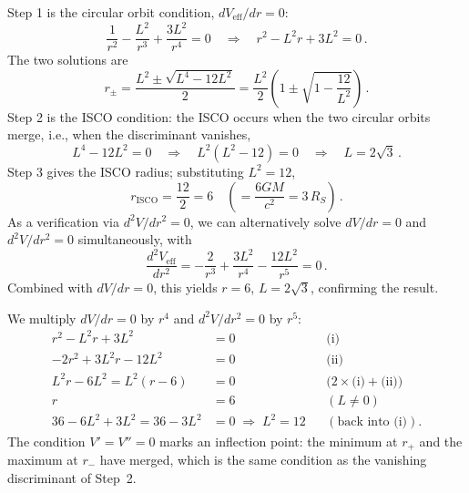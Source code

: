 Step 1 is the circular orbit condition, $dV_{\mathrm{eff}}/dr = 0$:
\begin{equation*}
    \frac{1}{r^2} - \frac{L^2}{r^3} + \frac{3L^2}{r^4} = 0
    \quad\Longrightarrow\quad
    r^2 - L^2 r + 3L^2 = 0 \,.
\end{equation*}
The two solutions are
\begin{equation*}
    r_\pm = \frac{L^2 \pm \sqrt{L^4 - 12L^2}}{2}
    = \frac{L^2}{2}\left(1 \pm \sqrt{1 - \frac{12}{L^2}}\right) \,.
\end{equation*}
Step 2 is the ISCO condition: the ISCO occurs when the two circular
orbits merge, i.e., when the discriminant vanishes,
\begin{equation*}
    L^4 - 12L^2 = 0 \quad\Longrightarrow\quad L^2(L^2 - 12) = 0
    \quad\Longrightarrow\quad L = 2\sqrt{3} \,.
\end{equation*}
Step 3 gives the ISCO radius; substituting $L^2 = 12$,
\begin{equation*}
    r_{\mathrm{ISCO}} = \frac{12}{2} = \boxed{6} \quad
    \left(= \frac{6GM}{c^2} = 3\,R_S\right) \,.
\end{equation*}
As a verification via $d^2V/dr^2 = 0$, we can alternatively solve
$dV/dr = 0$ and $d^2V/dr^2 = 0$ simultaneously, with
\begin{equation*}
    \frac{d^2 V_{\mathrm{eff}}}{dr^2} = -\frac{2}{r^3} + \frac{3L^2}{r^4}
    - \frac{12L^2}{r^5} = 0 \,.
\end{equation*}
Combined with $dV/dr = 0$, this yields $r = 6$, $L = 2\sqrt{3}$,
confirming the result.

\begin{derivation}
We multiply $dV/dr = 0$ by $r^4$ and $d^2V/dr^2 = 0$ by $r^5$:
\begin{align*}
r^2 - L^2r + 3L^2 &= 0 && \text{(i)} \\
-2r^2 + 3L^2r - 12L^2 &= 0 && \text{(ii)} \\
L^2r - 6L^2 = L^2(r - 6) &= 0 && \bigl(2\times\text{(i)} + \text{(ii)}\bigr) \\
r &= 6 && (L \neq 0) \\
36 - 6L^2 + 3L^2 = 36 - 3L^2 &= 0 \;\Rightarrow\; L^2 = 12
  && (\text{back into (i)}) .
\end{align*}
The condition $V' = V'' = 0$ marks an inflection point: the minimum at $r_+$
and the maximum at $r_-$ have merged, which is the same condition as the
vanishing discriminant of Step~2.
\end{derivation}


